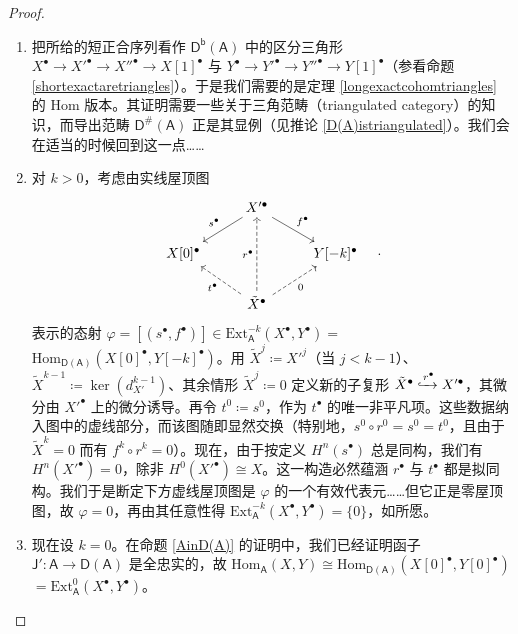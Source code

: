 \begin{proof}
	\ \vspace*{0.0cm}
	\renewcommand{\theenumi}{\alph{enumi}}
	\begin{enumerate}[leftmargin=0.5cm]
		\item 把所给的短正合序列看作 $\mathsf{D^b}(\mathsf{A})$ 中的区分三角形 $X^\bullet\rightarrow X'^\bullet\rightarrow X''^\bullet\rightarrow X[1]^\bullet$ 与 $Y^\bullet\rightarrow Y'^\bullet\rightarrow Y''^\bullet\rightarrow Y[1]^\bullet$（参看命题 \ref{shortexactaretriangles}）。于是我们需要的是定理 \ref{longexactcohomtriangles} 的 Hom 版本。其证明需要一些关于三角范畴（triangulated category）的知识，而导出范畴 $\mathsf{D^\#\!(A)}$ 正是其显例（见推论 \ref{D(A)istriangulated}）。我们会在适当的时候回到这一点……
		
		\item 对 $k>0$，考虑由实线屋顶图
		\begin{equation}\label{commutingroofs}
			\begin{tikzcd}
				& X'^\bullet\arrow[dl, "s^\bullet"']\arrow[dr, "f^\bullet"] & \\
				X[0]^\bullet & & Y[-k]^\bullet \\
				& \tilde{X}^\bullet\arrow[ul, dashed, "t^\bullet"]\arrow[uu, dashed, "r^\bullet"]\arrow[ur, dashed, "0"'] 
			\end{tikzcd}\quad.
		\end{equation}
		表示的态射 $\varphi=[(s^\bullet,f^\bullet)]\in\text{Ext}_\mathsf{A}^{-k}(X^\bullet,Y^\bullet)=$ $\text{Hom}_\mathsf{D(A)}(X[0]^\bullet,Y[-k]^\bullet)$。用 $\tilde{X}^j\coloneqq X'^j$（当 $j<k-1$）、$\tilde{X}^{k-1}\coloneqq\ker(d_{X'}^{k-1})$、其余情形 $\tilde{X}^j\coloneqq 0$ 定义新的子复形 $\tilde{X}^\bullet\xhookrightarrow{r^\bullet}X'^\bullet$，其微分由 $X'^\bullet$ 上的微分诱导。再令 $t^0\coloneqq s^0$，作为 $t^\bullet$ 的唯一非平凡项。这些数据纳入图中的虚线部分，而该图随即显然交换（特别地，$s^0\circ r^0=s^0=t^0$，且由于 $\tilde{X}^k=0$ 而有 $f^k\circ r^k=0$）。现在，由于按定义 $H^n(s^\bullet)$ 总是同构，我们有 $H^n(X'^\bullet)=0$，除非 $H^0(X'^\bullet)\cong X$。这一构造必然蕴涵 $r^\bullet$ 与 $t^\bullet$ 都是拟同构。我们于是断定下方虚线屋顶图是 $\varphi$ 的一个有效代表元……但它正是零屋顶图，故 $\varphi=0$，再由其任意性得 $\text{Ext}_\mathsf{A}^{-k}(X^\bullet,Y^\bullet)=\{0\}$，如所愿。
		
		\item 现在设 $k=0$。在命题 \ref{AinD(A)} 的证明中，我们已经证明函子 $\mathsf{J}'\!:\!\mathsf{A}\rightarrow\mathsf{D(A)}$ 是全忠实的，故 $\text{Hom}_\mathsf{A}(X,Y)\cong\text{Hom}_\mathsf{D(A)}(X[0]^\bullet,Y[0]^\bullet)$ $=\text{Ext}_\mathsf{A}^0(X^\bullet,Y^\bullet)$。
		

\end{enumerate}
\end{proof}
